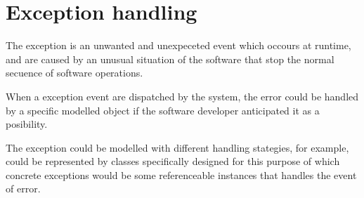 \section{Exception handling}

The exception is an unwanted and 
unexpeceted event which occours 
at runtime, and are caused by an unusual 
situation of the software that  
stop the normal secuence of  
software operations. 

When a exception event are 
dispatched by the system, 
the error could be handled 
by a specific modelled object 
if the software developer anticipated  
it as a posibility. 

The exception could be modelled 
with different handling stategies,     
\cite{MoonStallman:1983}
\cite{Dony:1988}
\cite{DonyC:1990}
\cite{Leavens:1991}
for example, could be represented 
by classes specifically 
designed for this purpose of which 
concrete exceptions would be some
referenceable instances that 
handles the event of error. 

\begin{comment}
	\todo[inline]{leer la siguiente bibliografia:
	
	[MSW83] David Moon, Richard M. Stallman, and  Daniel Weinreb.  Lisp Machine 
	Manual  (fifth edition). Massachusetts Institute of Technology, Artificial Intelligence Laboratory, Cambridge, Mass., 
	January  1983.
	
	5.4 Exception Handling
	Hierarchies can also be used to classify 
	and organize exceptions in large 
	software systems. I think this was
	first done in the Flavors mechanism 
	of the Lisp Machine [MSW83]. Recent 
	papers on this topic include
	[Don88] [Don90].
	
	Extraido del paper: 
	introduction to the literature on O-O design, 
	programming and languages.
	Gary t. leavens
	}

esta tambien es una buena partida para saber los distintos
tipos de errores que no trato aqui por ser innecesarios
para la norma
http://www.sap-img.com/abap/difference-between-error-and-exception.htm
\end{comment}
